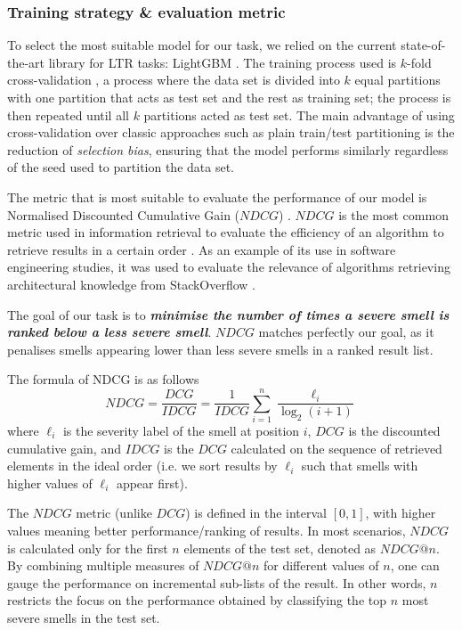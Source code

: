 \subsubsection{Training strategy \& evaluation metric}\label{c6:sec:perf-metric}
To select the most suitable model for our task, we relied on the current state-of-the-art library for LTR tasks: LightGBM \cite{Ke2017}.
The training process used is $k$-fold cross-validation \cite{Stone1974}, a process where the data set is divided into $k$ equal partitions with one partition that acts as test set and the rest as training set; the process is then repeated until all $k$ partitions acted as test set.
The main advantage of using cross-validation over classic approaches such as plain train/test partitioning is the reduction of \emph{selection bias}, ensuring that the model performs similarly regardless of the seed used to partition the data set.

The metric that is most suitable to evaluate the performance of our model is Normalised Discounted Cumulative Gain ($NDCG$) \cite{Jarvelin2002}. 
$NDCG$ is the most common metric used in information retrieval to evaluate the efficiency of an algorithm to retrieve results in a certain order \cite{Wang2018}.
As an example of its use in software engineering studies, it was used to evaluate the relevance of algorithms retrieving architectural knowledge from StackOverflow \cite{Soliman2018}.

The goal of our task is to \textit{\textbf{minimise the number of times a severe smell is ranked below a less severe smell}}.
$NDCG$ matches perfectly our goal, as it penalises smells appearing lower than less severe smells in a ranked result list.

The formula of NDCG is as follows
$$NDCG = \frac{DCG}{IDCG} = \frac{1}{IDCG}\sum_{i=1}^n\frac{\ell_i}{\log_2(i+1)}$$
where $\ell_i$ is the severity label of the smell at position $i$, $DCG$ is the discounted cumulative gain, and $IDCG$ is the $DCG$ calculated on the sequence of retrieved elements in the ideal order (i.e. we sort results by $\ell_i$ such that smells with higher values of $\ell_i$ appear first).

The $NDCG$ metric (unlike $DCG$) is defined in the interval $[0, 1]$, with higher values meaning better performance/ranking of results.
In most scenarios, $NDCG$ is calculated only for the first $n$ elements of the test set, denoted as $NDCG@n$.
By combining multiple measures of $NDCG@n$ for different values of $n$, one can gauge the performance on incremental sub-lists of the result.
In other words, $n$ restricts the focus on the performance obtained by classifying the top $n$ most severe smells in the test set.

